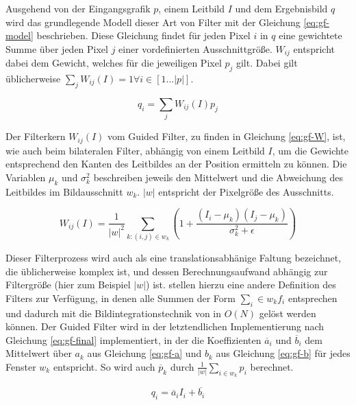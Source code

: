 Ausgehend von der Eingangsgrafik \(p\), einem Leitbild \(I\) und dem Ergebnisbild \(q\) wird das grundlegende Modell dieser Art von Filter mit der Gleichung \ref{eq:gf-model} beschrieben. Diese Gleichung findet für jeden Pixel \(i\) in \(q\) eine gewichtete Summe über jeden Pixel \(j\) einer vordefinierten Ausschnittgröße. \(W_{ij}\) entspricht dabei dem Gewicht, welches für die jeweiligen Pixel \(p_j\) gilt. Dabei gilt üblicherweise  \(\sum_{j} W_{ij}(I)=1 \forall i \in [1\ldots |p|]\). \citep{he2010guided}

\begin{equation} \label{eq:gf-model}
q_{i} = \sum_j W_{ij}(I)p_j
\end{equation}

Der Filterkern \(W_{ij}(I)\) vom Guided Filter, zu finden in Gleichung \ref{eq:gf-W}, ist, wie auch beim bilateralen Filter, abhängig von einem Leitbild \(I\), um die Gewichte entsprechend den Kanten des Leitbildes an der Position ermitteln zu können. Die Variablen \(\mu_k\) und \(\sigma^2_k\) beschreiben jeweils den Mittelwert und die Abweichung des Leitbildes im Bildausschnitt \(w_k\). \(|w|\) entspricht der Pixelgröße des Ausschnitts. \citep{he2010guided}

\begin{equation} \label{eq:gf-W}
W_{ij}(I) = \frac{1}{|w|^2} \sum_{k:(i,j) \in w_k} (1+\frac{(I_i-\mu_k)(I_j-\mu_k)}{\sigma^2_k + \epsilon})
\end{equation}

Dieser Filterprozess wird auch als eine translationsabhänige Faltung bezeichnet, die üblicherweise komplex ist, und dessen Berechnungsaufwand abhängig zur Filtergröße (hier zum Beispiel \(|w|\)) ist. \citet{he2010guided} stellen hierzu eine andere Definition des Filters zur Verfügung, in denen alle Summen der Form \(\sum_i\in w_k f_i\) entsprechen und dadurch mit die Bildintegrationstechnik von \citet{crow1984summed} in \(O(N)\) gelöst werden können. Der Guided Filter wird in der letztendlichen Implementierung nach Gleichung \ref{eq:gf-final} implementiert, in der die Koeffizienten \(\overline{a}_i\) und \(\overline{b}_i\) dem Mittelwert über \(a_k\) aus Gleichung \ref{eq:gf-a} und \(b_k\) aus Gleichung \ref{eq:gf-b} für jedes Fenster \(w_k\) entspricht. So wird auch \(\overline{p}_k\) durch \(\frac{1}{|w|} \sum_{i \in w_k} p_i\) berechnet.



\begin{equation} \label{eq:gf-final}
q_i = \overline{a}_iI_i+\overline{b_i}
\end{equation}

